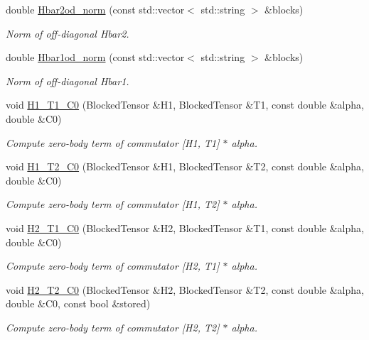 \begin{DoxyCompactItemize}
double \mbox{\hyperlink{classforte_1_1_d_s_r_g___m_r_p_t_ae543636fcbbabe455c0250ebad1e3088}{Hbar2od\+\_\+norm}} (const std\+::vector$<$ std\+::string $>$ \&blocks)
\begin{DoxyCompactList}\small\item\em Norm of off-\/diagonal Hbar2. \end{DoxyCompactList}\item 
double \mbox{\hyperlink{classforte_1_1_d_s_r_g___m_r_p_t_a69dcc59344184e94a3ccacac41cea8f1}{Hbar1od\+\_\+norm}} (const std\+::vector$<$ std\+::string $>$ \&blocks)
\begin{DoxyCompactList}\small\item\em Norm of off-\/diagonal Hbar1. \end{DoxyCompactList}\item 
void \mbox{\hyperlink{classforte_1_1_d_s_r_g___m_r_p_t_ae0d0412424b3a5d78dfcdb00e72cd955}{H1\+\_\+\+T1\+\_\+\+C0}} (Blocked\+Tensor \&H1, Blocked\+Tensor \&T1, const double \&alpha, double \&C0)
\begin{DoxyCompactList}\small\item\em Compute zero-\/body term of commutator \mbox{[}H1, T1\mbox{]} $\ast$ alpha. \end{DoxyCompactList}\item 
void \mbox{\hyperlink{classforte_1_1_d_s_r_g___m_r_p_t_aee81005e7b9859f8bceea16dd8728aa7}{H1\+\_\+\+T2\+\_\+\+C0}} (Blocked\+Tensor \&H1, Blocked\+Tensor \&T2, const double \&alpha, double \&C0)
\begin{DoxyCompactList}\small\item\em Compute zero-\/body term of commutator \mbox{[}H1, T2\mbox{]} $\ast$ alpha. \end{DoxyCompactList}\item 
void \mbox{\hyperlink{classforte_1_1_d_s_r_g___m_r_p_t_a0385770241da7d182d13c4e3ec51fcb2}{H2\+\_\+\+T1\+\_\+\+C0}} (Blocked\+Tensor \&H2, Blocked\+Tensor \&T1, const double \&alpha, double \&C0)
\begin{DoxyCompactList}\small\item\em Compute zero-\/body term of commutator \mbox{[}H2, T1\mbox{]} $\ast$ alpha. \end{DoxyCompactList}\item 
void \mbox{\hyperlink{classforte_1_1_d_s_r_g___m_r_p_t_ac5b7802f0bc323ef568dbc25b5a0eed3}{H2\+\_\+\+T2\+\_\+\+C0}} (Blocked\+Tensor \&H2, Blocked\+Tensor \&T2, const double \&alpha, double \&C0, const bool \&stored)
\begin{DoxyCompactList}\small\item\em Compute zero-\/body term of commutator \mbox{[}H2, T2\mbox{]} $\ast$ alpha. \end{DoxyCompactList}\item 

\end{DoxyCompactItemize}
